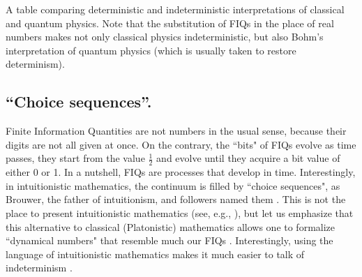 \documentclass[12pt]{article}
\begin{document}
\begin{table*}[]
\caption{\small{A table comparing deterministic and indeterministic interpretations of classical and quantum physics. Note that the substitution of FIQs in the place of real numbers makes not only classical physics indeterministic, but also  Bohm's interpretation of quantum physics (which is usually taken to restore determinism).}}
\label{table}
\end{table*}


\subsection{``Choice sequences''.}
Finite Information Quantities are not numbers in the usual sense, because their digits are not all given at once. On the contrary, the ``bits" of FIQs evolve as time passes, they start from the value $\frac{1}{2}$ and evolve until they acquire a bit value of either 0 or 1. In a nutshell, FIQs are processes that develop in time. Interestingly, in intuitionistic mathematics, the continuum is filled by ``choice sequences", as Brouwer, the father of intuitionism, and followers named them \cite{Brouwer1948}. This is not the place to present intuitionistic mathematics (see, e.g., \cite{IndeterminateNumbersPosy}), but let us emphasize that this alternative to classical (Platonistic) mathematics allows one to formalize ``dynamical numbers" that resemble much our FIQs \cite{Troelstra}. Interestingly, using the language of intuitionistic mathematics makes it much easier to talk of indeterminism \cite{NGHiddenReals}.
\end{document}
